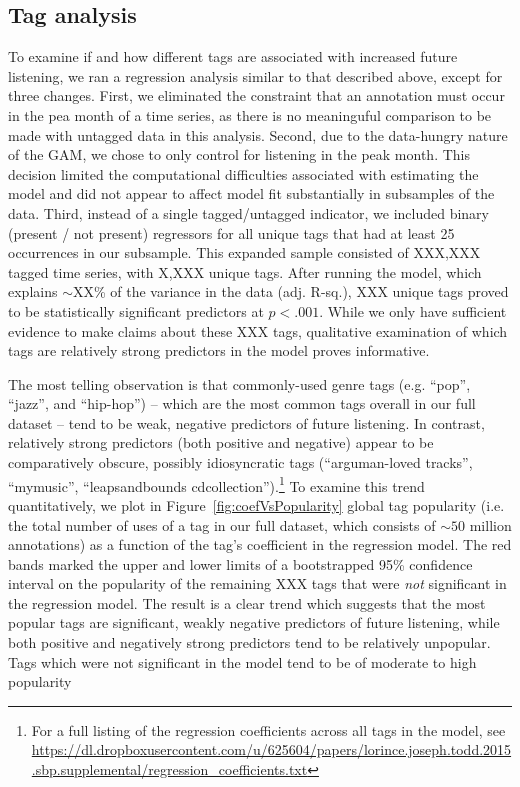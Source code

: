 \subsection{Tag analysis}
To examine if and how different tags are associated with increased future listening, we ran a regression analysis similar to that described above, except for three changes. First, we eliminated the constraint that an annotation must occur in the pea month of a time series, as there is no meaninguful comparison to be made with untagged data in this analysis. Second, due to the data-hungry nature of the GAM, we chose to only control for listening in the peak month. This decision limited the computational difficulties associated with estimating the model and did not appear to affect model fit substantially in subsamples of the data. Third, instead of a single tagged/untagged indicator, we included binary (present / not present) regressors for all unique tags that had at least 25 occurrences in our subsample.  This expanded sample consisted of XXX,XXX tagged time series, with X,XXX unique tags. After running the model, which explains $\sim$XX\% of the variance in the data (adj. R-sq.), XXX unique tags  proved to be statistically significant predictors at $p <.001$. While we only have sufficient evidence to make claims about these XXX tags, qualitative examination of which tags are relatively strong predictors in the model proves informative.

The most telling observation is that commonly-used genre tags (e.g. ``pop'', ``jazz'', and ``hip-hop'') -- which are the most common tags overall in our full dataset -- tend to be weak, negative predictors of future listening. In contrast, relatively strong predictors (both positive and negative) appear to be comparatively obscure, possibly idiosyncratic tags (``arguman-loved tracks'', ``mymusic'', ``leapsandbounds cdcollection'').\footnote{For a full listing of the regression coefficients across all tags in the model, see \url{https://dl.dropboxusercontent.com/u/625604/papers/lorince.joseph.todd.2015.sbp.supplemental/regression_coefficients.txt}} To examine this trend quantitatively, we plot in Figure~\ref{fig:coefVsPopularity} global tag popularity (i.e. the total number of uses of a tag in our full dataset, which consists of $\sim 50$ million annotations) as a function of the tag's coefficient in the regression model. The red bands marked the upper and lower limits of a bootstrapped 95\% confidence interval on the popularity of the remaining XXX tags that were \emph{not} significant in the regression model. The result is a clear trend which suggests that the most popular tags are significant, weakly negative predictors of future listening, while both positive and negatively strong predictors tend to be relatively unpopular. Tags which were not significant in the model tend to be of moderate to high popularity

